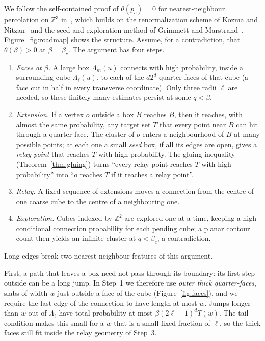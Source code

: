 \documentclass[11pt]{article}
\theoremstyle{definition}
\theoremstyle{remark}
\numberwithin{equation}{section}
\newcommand{\Z}{\mathbb Z}
\newcommand{\1}{\mathbf 1}
\newcommand{\Lam}{\Lambda}
\begin{document}
We follow the self-contained proof of $\theta(p_c)=0$ for nearest-neighbour percolation on $\Z^3$
in~\cite{OpenAIZ3}, which builds on the renormalization scheme of Kozma and
Nitzan~\cite[\S4]{KozmaNitzan2024} and the seed-and-exploration method of Grimmett and
Marstrand~\cite{GrimmettMarstrand1990}. Figure~\ref{fig:roadmap} shows the structure. Assume, for
a contradiction, that $\theta(\beta)>0$ at $\beta=\beta_c$. The argument has four steps.
\begin{enumerate}
\item \emph{Faces at $\beta$.} A large box $\Lam_m(u)$ connects with high probability, inside a
surrounding cube $\Lam_\ell(u)$, to each of the $d2^d$ quarter-faces of that cube (a face cut in half
in every transverse coordinate). Only three radii $\ell$ are needed, so these finitely many estimates
persist at some $q<\beta$.
\item \emph{Extension.} If a vertex $o$ outside a box $B$ reaches $B$, then it reaches, with
almost the same probability, any target set $T$ that every point near $B$ can hit through a
quarter-face. The cluster of $o$ enters a neighbourhood of $B$ at many possible points; at each one a
small \emph{seed} box, if all its edges are open, gives a \emph{relay point} that reaches $T$ with high
probability. The gluing inequality (Theorem~\ref{thm:gluing}) turns ``every relay point reaches $T$ with
high probability'' into ``$o$ reaches $T$ if it reaches a relay point''.
\item \emph{Relay.} A fixed sequence of extensions moves a connection from the centre of one
coarse cube to the centre of a neighbouring one.
\item \emph{Exploration.} Cubes indexed by $\Z^2$ are explored one at a time, keeping a high
conditional connection probability for each pending cube; a planar contour count then yields an
infinite cluster at $q<\beta_c$, a contradiction.
\end{enumerate}

Long edges break two nearest-neighbour features of this argument.

First, a path that leaves a box need not pass through its boundary: its first step outside can
be a long jump. In Step~1 we therefore use \emph{outer thick quarter-faces}, slabs of width $w$
just outside a face of the cube (Figure~\ref{fig:faces}), and we require the last edge of the
connection to have length at most $w$. Jumps longer than $w$ out of $\Lam_\ell$ have total
probability at most $\beta(2\ell+1)^dT(w)$. The tail condition makes this small for a $w$ that is
a small fixed fraction of $\ell$, so the thick faces still fit inside the relay geometry of Step~3.
\end{document}
